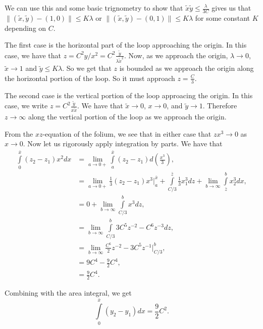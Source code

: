 \begin{enumerate}
We can use this and some basic trignometry to show that \(\tilde x \tilde y \leq \frac{\lambda}{3C}\) gives us that \(\|(\tilde x, \tilde y) - (1,0)\| \leq K \lambda\) or
\(\|(\tilde x, \tilde y) - (0, 1)\| \leq K \lambda\) for some constant \(K\) depending on \(C\).

The first case is the horizontal part of the loop approaching the origin. In this case, we have that \(z = C^2 y / x^2 = C^2 \frac{\tilde y} {\lambda \tilde x^2}\). Now, as we approach
the origin, \(\lambda \to 0\), \(\tilde x \to 1\) and \(\tilde y \leq K \lambda\). So we get that \(z\) is bounded as we approach the origin along the horizontal portion of the loop.
So it must approach \(z = \frac{C}{3}\).

The second case is the vertical portion of the loop approacing the origin. In this case, we write \(z = C^2 \frac{\tilde y}{x\tilde x}\). We have that \(\tilde x \to 0\), \(x \to 0\), and
\(\tilde y \to 1\). Therefore \(z \to \infty\) along the vertical portion of the loop as we approach the origin.

From the \(xz\)-equation of the folium, we see that in either case that \(zx^3 \to 0\) as \(x \to 0\). Now let us rigorously apply integration by parts.
We have that
\begin{align}
\int\limits_0^{\bar x} (z_2 - z_1) x^2 dx & = \lim\limits_{a \to 0+} \int\limits_a^{\bar x} (z_2 - z_1) d \left(\frac{x^3}{3}\right), \\
    & = \lim\limits_{a \to 0+} \frac{1}{3}(z_2 - z_1)x^3\big |_a^{\bar x} + \int\limits_{C / 3} ^ {\bar z}\frac{1}{3} x_1^3 dz + \lim\limits_{b \to\infty} \int\limits_{\bar z}^b x_2^3 dx, \\
    & = 0 + \lim\limits_{b\to\infty} \int\limits_{C/3}^b x^3 dz,\\
    & = \lim\limits_{b\to \infty} \int\limits_{C/3}^b 3C^5z^{-2} - C^6 z^{-3} dz, \\
    & = \lim\limits_{b\to \infty} \frac{C^6}{2}z^{-2} - 3C^5 z^{-1} \big|_{C/3}^b, \\ 
    & = 9C^4 - \frac{9}{2}C^4, \\
    & = \frac{9}{2}C^4.
\end{align} 

Combining with the area integral, we get
\begin{equation}
\int\limits_0^{\bar x} (y_2 - y_1) dx = \frac{9}{2}C^2.
\end{equation}
\end{enumerate}
